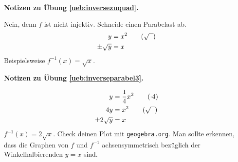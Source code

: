 \documentclass[%
11pt,%
twoside,%
titlepage,%
swissgerman,%
headsepline%
]{scrartcl}
\newcommand{\faReturnGray}{\textcolor{gray}{\faMailReply}} %
\newcommand{\geogebralink}{\href{https://www.geogebra.org/calculator}{\texttt{geogebra.org}}}
\theoremstyle{definition}
\theoremstyle{plain}
\newcommand{\concatueb}[1]{ueb:#1}%
\newcommand{\concatlsg}[1]{lsg:#1}%
\newenvironment{lsg}[1]{%
    \par\noindent\textbf{Notizen zu Übung \ref{\concatueb{#1}}.}%
    \label{\concatlsg{#1}} %
    \hfill\hyperref[\concatueb{#1}]{\faReturnGray}\par %
}{%
    \par%
}
\begin{document}
\begin{lsg}	{inversezuquad}
Nein, denn $f$ ist nicht injektiv. Schneide einen Parabelast ab.
\begin{align*}
y &= x^2\tag{$\sqrt{\phantom{x}}$}\\
\pm\sqrt{y} &= x
\end{align*}
Beispielsweise $f^{-1}(x)=\sqrt{x}$.
\end{lsg}
\begin{lsg}{inverseparabel3}
\begin{align*}
y&=\frac{1}{4}x^2\tag{$\cdot 4$}\\
4y&=x^2\tag{$\sqrt{\phantom{x}}$}\\
\pm2\sqrt{y} &=x\notag
\end{align*}
$f^{-1}(x)=2\sqrt{x}$. Check deinen Plot mit \geogebralink. Man sollte erkennen, dass die Graphen von $f$ und $f^{-1}$ achsensymmetrisch bezüglich der Winkelhalbierenden $y=x$ sind.
\end{lsg}
\end{document}
